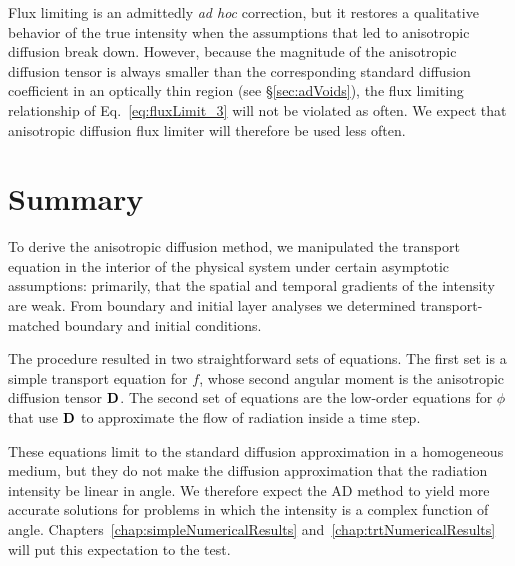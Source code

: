 Flux limiting is an admittedly \emph{ad hoc} correction, but it restores a
qualitative behavior of the true intensity when the assumptions that led to
anisotropic diffusion break down. However, because the magnitude of the
anisotropic diffusion tensor is always smaller than the corresponding standard
diffusion coefficient in an optically thin region (see \S\ref{sec:adVoids}), the
flux limiting relationship of Eq.~\eqref{eq:fluxLimit_3} will not be violated as
often. We expect that anisotropic diffusion flux limiter will therefore be used less often.

\section{Summary}
To derive the anisotropic diffusion method, we manipulated the transport
equation in the interior of the physical system under certain asymptotic
assumptions: primarily, that
the spatial and temporal gradients of the intensity are weak. From boundary and
initial layer analyses we determined transport-matched boundary and initial
conditions.  

The procedure resulted in two straightforward sets of equations. The first set
is a simple transport equation for $f$, whose second angular moment is
the anisotropic diffusion tensor $\mathbf{D}$. The second set of equations are the
low-order equations for $\phi$ that use $\mathbf{D}$ to approximate the flow of
radiation inside a time step. 

These equations limit to the standard diffusion approximation in a homogeneous
medium, but they do not make the diffusion approximation that the radiation
intensity be linear in
angle. We therefore expect the AD method to yield more accurate solutions
for problems in which the intensity is a complex function of angle.
Chapters~\ref{chap:simpleNumericalResults}
and~\ref{chap:trtNumericalResults} will put this expectation to the test.

